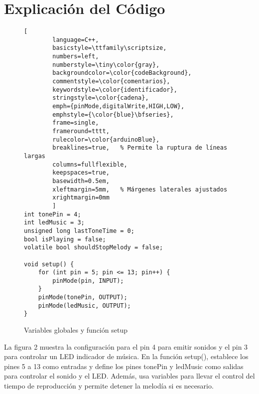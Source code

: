 
\setlength{\parindent}{0pt}
\setlength{\parskip}{6pt}
\section{Explicación del Código}

\begin{figure}[H]
	\centering
	\begin{lstlisting}[
		language=C++,
		basicstyle=\ttfamily\scriptsize,
		numbers=left,
		numberstyle=\tiny\color{gray},
		backgroundcolor=\color{codeBackground},
		commentstyle=\color{comentarios},
		keywordstyle=\color{identificador},
		stringstyle=\color{cadena},
		emph={pinMode,digitalWrite,HIGH,LOW},
		emphstyle={\color{blue}\bfseries},
		frame=single,
		frameround=tttt,
		rulecolor=\color{arduinoBlue},
		breaklines=true,   % Permite la ruptura de líneas largas
		columns=fullflexible,
		keepspaces=true,
		basewidth=0.5em,
		xleftmargin=5mm,   % Márgenes laterales ajustados
		xrightmargin=0mm
		]
int tonePin = 4;
int ledMusic = 3;
unsigned long lastToneTime = 0;
bool isPlaying = false;
volatile bool shouldStopMelody = false;

void setup() {
	for (int pin = 5; pin <= 13; pin++) {
		pinMode(pin, INPUT);
	}
	pinMode(tonePin, OUTPUT);
	pinMode(ledMusic, OUTPUT);
}
	\end{lstlisting}
	\caption{Variables globales y función setup}
	\label{fig:codigo-led}
\end{figure}
La figura 2 muestra la configuración para el pin 4 para emitir sonidos y el pin 3 para controlar un LED indicador de música. En la función setup(), establece los pines 5 a 13 como entradas y define los pines tonePin y ledMusic como salidas para controlar el sonido y el LED. Además, usa variables para llevar el control del tiempo de reproducción y permite detener la melodía si es necesario.
